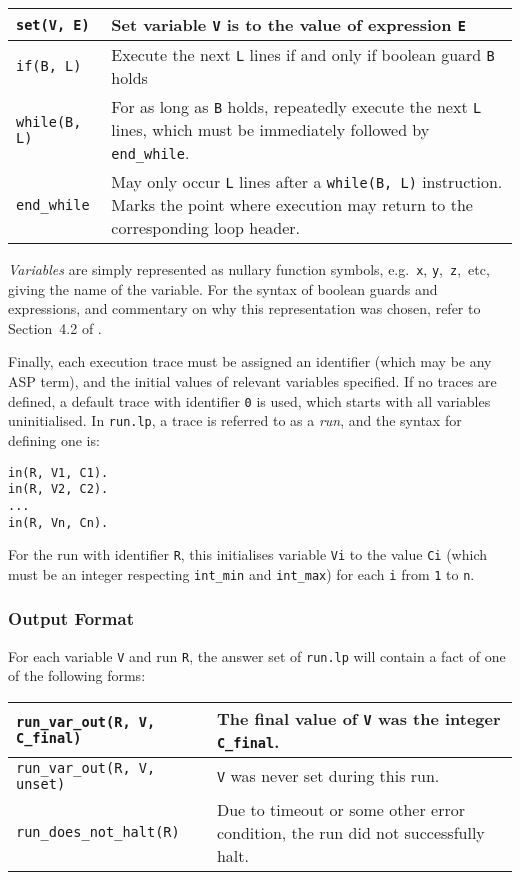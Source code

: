 \documentclass[a4paper,twoside,notitlepage,12pt]{article}
\begin{document}
\begin{tabularx}{\textwidth}{|l|X|}
\hline
\verb|set(V, E)| &
Set variable \verb|V| is to the value of expression \verb|E| \\*
\hline
\verb|if(B, L)| &
Execute the next \verb|L| lines if and only if boolean guard \verb|B| holds \\*
\hline
\verb|while(B, L)| &
For as long as \verb|B| holds, repeatedly execute the next \verb|L| lines, which must 
be immediately followed by \verb|end_while|. \\*
\hline
\verb|end_while| &
May only occur \verb|L| lines after a \verb|while(B, L)| instruction. Marks the point 
where execution may return to the corresponding loop header. \\*
\hline
\end{tabularx}

\emph{Variables} are simply represented as nullary function symbols, e.g.\ \verb|x|, 
\verb|y|,\ \verb|z|,\ etc, giving the name of the variable. For the syntax of boolean 
guards and expressions, and commentary on why this representation was chosen, refer to 
Section~4.2 of \cite{final}.

Finally, each execution trace must be assigned an identifier (which may be any ASP 
term), and the initial values of relevant variables specified. If no traces are defined, 
a default trace with identifier \verb|0| is used, which starts with all variables 
uninitialised. In \verb|run.lp|, a trace is referred to as a \emph{run}, and the syntax 
for defining one is:

\begin{verbatim}
in(R, V1, C1).
in(R, V2, C2).
...
in(R, Vn, Cn).
\end{verbatim}

For the run with identifier \verb|R|, this initialises variable \verb|Vi| to the value 
\verb|Ci| (which must be an integer respecting \verb|int_min| and \verb|int_max|) for 
each \verb|i| from \verb|1| to \verb|n|.

\subsubsection{Output Format} \label{sec:sim:out}

For each variable \verb|V| and run \verb|R|, the answer set of \verb|run.lp| will 
contain a fact of one of the following forms:

\begin{tabularx}{\textwidth}{|l|X|}
\hline
\verb|run_var_out(R, V, C_final)| &
The final value of \verb|V| was the integer \verb|C_final|. \\*
\hline
\verb|run_var_out(R, V, unset)| &
\verb|V| was never set during this run. \\*
\hline
\verb|run_does_not_halt(R)| &
Due to timeout or some other error condition, the run did not successfully halt. \\*
\hline
\end{tabularx}
\end{document}
